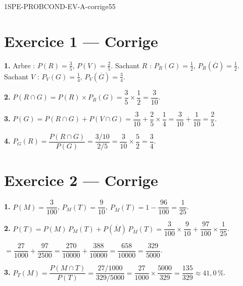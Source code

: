 \begin{evaluation}{1SPE-PROBCOND-EV-A-corrige}{55}

\section*{Exercice 1 --- Corrige}


\textbf{1.} Arbre : $P(R) = \frac{3}{5}$, $P(V) = \frac{2}{5}$. Sachant $R$ : $P_R(G) = \frac{1}{2}$, $P_R(\overline{G}) = \frac{1}{2}$. Sachant $V$ : $P_V(G) = \frac{1}{4}$, $P_V(\overline{G}) = \frac{3}{4}$.

\medskip
\textbf{2.} $P(R \cap G) = P(R) \times P_R(G) = \dfrac{3}{5} \times \dfrac{1}{2} = \dfrac{3}{10}$.

\medskip
\textbf{3.} $P(G) = P(R \cap G) + P(V \cap G) = \dfrac{3}{10} + \dfrac{2}{5} \times \dfrac{1}{4} = \dfrac{3}{10} + \dfrac{1}{10} = \dfrac{2}{5}$.

\medskip
\textbf{4.} $P_G(R) = \dfrac{P(R \cap G)}{P(G)} = \dfrac{3/10}{2/5} = \dfrac{3}{10} \times \dfrac{5}{2} = \dfrac{3}{4}$.

\section*{Exercice 2 --- Corrige}


\textbf{1.} $P(M) = \dfrac{3}{100}$, $P_M(T) = \dfrac{9}{10}$, $P_{\overline{M}}(T) = 1 - \dfrac{96}{100} = \dfrac{1}{25}$.

\medskip
\textbf{2.} $P(T) = P(M)\,P_M(T) + P(\overline{M})\,P_{\overline{M}}(T) = \dfrac{3}{100} \times \dfrac{9}{10} + \dfrac{97}{100} \times \dfrac{1}{25}$.

$= \dfrac{27}{1000} + \dfrac{97}{2500} = \dfrac{270}{10000} + \dfrac{388}{10000} = \dfrac{658}{10000} = \dfrac{329}{5000}$.

\medskip
\textbf{3.} $P_T(M) = \dfrac{P(M \cap T)}{P(T)} = \dfrac{27/1000}{329/5000} = \dfrac{27}{1000} \times \dfrac{5000}{329} = \dfrac{135}{329} \approx 41{,}0\,\%$.


\end{evaluation}
